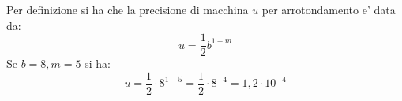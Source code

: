 Per definizione si ha che la precisione di macchina \(u\) per arrotondamento e' data da:
\[
u=\frac{1}{2} b ^{1-m}
\]
Se \(b=8, m=5\) si ha:
\[ 
u = \frac{1}{2}\cdot 8^{1-5} = \frac{1}{2}\cdot 8^{-4} = 1,2 \cdot 10^{-4} 
\]
